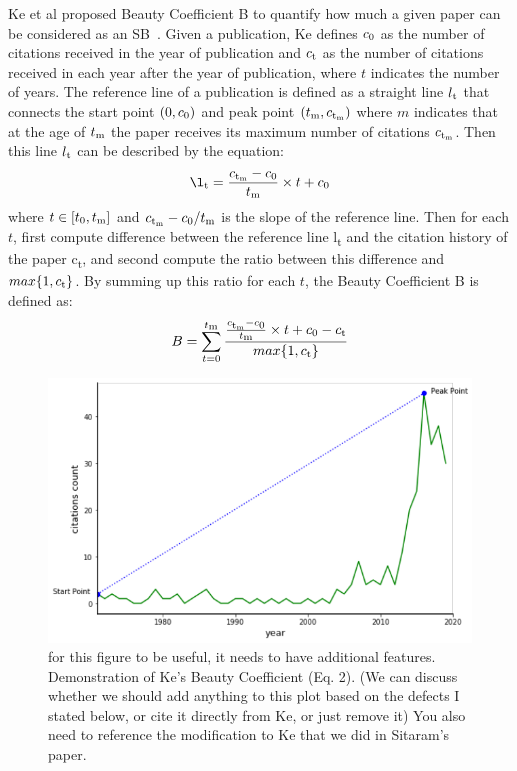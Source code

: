 \documentclass[utf8]{frontiersSCNS}
\begin{document}
Ke et al proposed Beauty Coefficient B to quantify how much a given paper can be considered as an SB~\citep{Ke2015}. Given a publication, Ke defines $c\textsubscript{0}$ as the number of citations received in the year of publication and $c\textsubscript{t}$ as the number of citations received in each year after the year of publication, where $t$ indicates the number of years. The reference line of a publication is defined as a straight line $l\textsubscript{t}$ that connects the start point $(0, c\textsubscript{0})$ and peak point $(t\textsubscript{m}, c\textsubscript{t\textsubscript{m}})$ where $m$ indicates that at the age of $t\textsubscript{m}$ the paper receives its maximum number of citations $c\textsubscript{t\textsubscript{m}}$. Then this line $l\textsubscript{t}$ can be described by the equation:
\begin{equation}
\l\textsubscript{t} = \frac{c\textsubscript{t\textsubscript{m}} - c\textsubscript{0}}{t\textsubscript{m}} \times t + c\textsubscript{0}
\end{equation}
where $t \in [t\textsubscript{0}, t\textsubscript{m}]$ and ${c\textsubscript{t\textsubscript{m}} - c\textsubscript{0}}/{t\textsubscript{m}}$ is the slope of the reference line. Then for each $t$, first compute difference between the reference line l\textsubscript{t} and the citation history of the paper c\textsubscript{t}, and second compute the ratio between this difference and $max\{1, c\textsubscript{t}\}$. By summing up this ratio for each $t$, the Beauty Coefficient B is defined as:
\begin{equation}
B = \sum_{t = 0}^{t\textsubscript{m}} \frac{\frac{c\textsubscript{t\textsubscript{m}} - c\textsubscript{0}}{t\textsubscript{m}} \times t + c\textsubscript{0} - c\textsubscript{t}}{max\{1, c\textsubscript{t}\}}
\end{equation}

\begin{figure}
\begin{center}
\includegraphics{Picture1}
\caption{for this figure to be useful, it needs to have additional features. Demonstration of Ke's Beauty Coefficient (Eq. 2). (We can discuss whether we should add anything to this plot based on the defects I stated below, or cite it directly from Ke, or just remove it) You also need to reference the modification to Ke that we did in Sitaram's paper.}
\label{fig:1} 
\end{center}
\end{figure}
\end{document}
